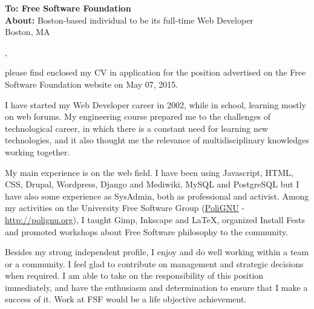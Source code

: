 \documentclass[]{friggeri-cover-letter}
\begin{document}
\thispagestyle{empty}
%
%

\textbf{To: Free Software Foundation}\\
\textbf{About:} Boston-based individual to be its full-time Web Developer\\
Boston, MA

\vfill

,

\vfill

please find enclosed my CV in application for the position advertised on the Free Software Foundation website on May 07, 2015.


I have started my Web Developer career in 2002, while in school, learning mostly on web forums. My engineering course prepared me to the challenges of technological career, in which there is a constant need for learning new technologies, and it also thought me the relevance of multidisciplinary knowledges working together.

My main experience is on the web field. I have been using Javascript, HTML, CSS, Drupal, Wordpress, Django and Mediwiki, MySQL and PostgreSQL but I have also some experience as SysAdmin, both as professional and activist.
Among my activities on the University Free Software Group (\href{http://polignu.org}{PoliGNU} - \url{http://polignu.org}), I taught Gimp, Inkscape and LaTeX, organized Install Fests and promoted workshops about Free Software philosophy to the community.

Besides my strong independent profile, I enjoy and do well working within a team or a community. I feel glad to contribute on management and strategic decisions when required. I am able to take on the responsibility of this position immediately, and have the enthusiasm and determination to ensure that I make a success of it. Work at FSF would be a life objective achievement.
\end{document}
